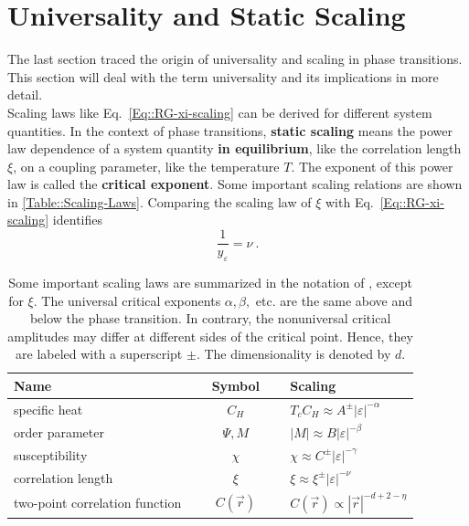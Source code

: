 	\section{Universality and Static Scaling} \label{Section::Universality}
	The last section traced the origin of universality and scaling in phase transitions. This section will deal with the term universality and its implications in more detail. \\
	
	Scaling laws like Eq.~\eqref{Eq::RG-xi-scaling} can be derived for different system quantities. In the context of phase transitions, \textbf{static scaling} means the power law dependence of a system quantity \textbf{in equilibrium}, like the correlation length $\xi$, on a coupling parameter, like the temperature $T$. The exponent of this power law is called the \textbf{critical exponent}. Some important scaling relations are shown in \autoref{Table::Scaling-Laws}. Comparing the scaling law of $\xi$ with Eq.~\eqref{Eq::RG-xi-scaling} identifies
	\begin{equation}
		\frac{1}{y_\varepsilon} = \nu ~.
	\end{equation}
	\begin{table}[h]
		\centering
		\caption{Some important scaling laws are summarized in the notation of \cite{pelissetto2002critical}, except for $\xi$. The universal critical exponents $\alpha, \beta,$ etc. are the same above and below the phase transition. In contrary, the nonuniversal critical amplitudes may differ at different sides of the critical point. Hence, they are labeled with a superscript $\pm$. The dimensionality is denoted by $d$.}
		\begin{tabular}{l c l}
			\toprule
			Name  & $\quad$ Symbol $\quad$ & Scaling \\
			\midrule
			specific heat & $C_H$ & $T_c C_H \approx A^{\pm} |\varepsilon|^{-\alpha}$ \\
			order parameter & $\Psi, M$ & $|M| \approx B |\varepsilon|^{-\beta}$ \\
			susceptibility & $\chi$ & $\chi \approx C^{\pm} |\varepsilon|^{-\gamma}$ \\
			correlation length & $\xi$ & $\xi \approx \xi^{\pm} |\varepsilon|^{-\nu}$ \\
			two-point correlation function & $C(\vec{r})$& $C(\vec{r}) \propto |\vec{r}|^{- d + 2 - \eta}$ \\
			\bottomrule
		\end{tabular}
		\label{Table::Scaling-Laws}
	\end{table}
